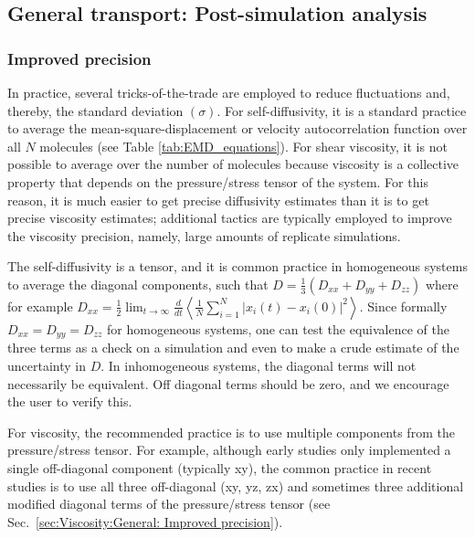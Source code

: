 \documentclass[9pt,bestpractices]{livecoms}
\begin{document}


\subsection{General transport: Post-simulation analysis} \label{sec:General: Post-simulation}

\subsubsection{Improved precision} \label{sec:General: Improve precision}

In practice, several tricks-of-the-trade are employed to reduce fluctuations and, thereby, the standard deviation $(\sigma)$. For self-diffusivity, it is a standard practice to average the mean-square-displacement or velocity autocorrelation function over all $N$ molecules (see Table \ref{tab:EMD_equations}). For shear viscosity, it is not possible to average over the number of molecules because viscosity is a collective property that depends on the pressure/stress tensor of the system. For this reason, it is much easier to get precise diffusivity estimates than it is to get precise viscosity estimates; additional tactics are typically employed to improve the viscosity precision, namely, large amounts of replicate simulations.

The self-diffusivity is a tensor, and it is common practice in homogeneous systems to average the diagonal components, such that $D = \frac{1}{3} (D_{xx} + D_{yy} + D_{zz})$ where for example $ D_{xx}=\displaystyle \frac{1}{2} \lim_{t\to\infty} \frac{d}{dt} \left\langle \frac{1}{N} \sum_{i=1}^{N} |x_i(t)-x_i(0)|^2 \right\rangle$. Since formally $D_{xx}=D_{yy}=D_{zz}$ for homogeneous systems, one can test the equivalence of the three terms as a check on a simulation and even to make a crude estimate of the uncertainty in $D$. In inhomogeneous systems, the diagonal terms will not necessarily be equivalent. Off diagonal terms should be zero, and we encourage the user to verify this.

For viscosity, the recommended practice is to use multiple components from the pressure/stress tensor. For example, although early studies only implemented a single off-diagonal component (typically xy), the common practice in recent studies is to use all three off-diagonal (xy, yz, zx) and sometimes three additional modified diagonal terms of the pressure/stress tensor (see Sec.\ \ref{sec:Viscosity:General: Improved precision}).
\end{document}
